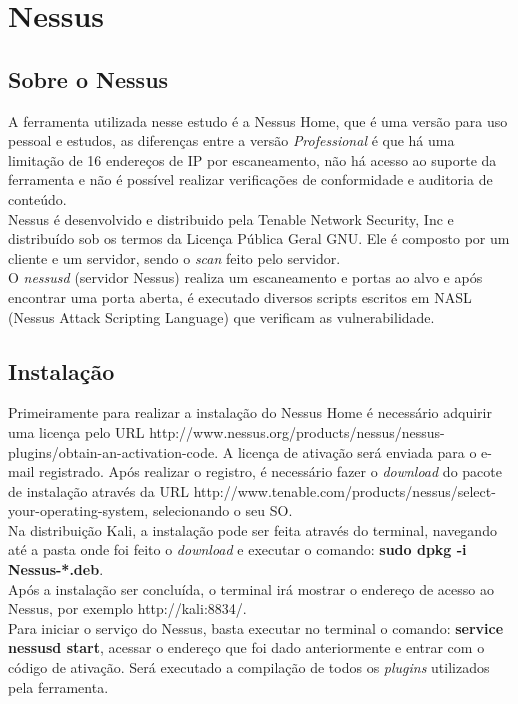 \documentclass[
	12pt,				%
	openright,			%
	twoside,			%
	a4paper,			%
	english,			%
	french,				%
	spanish,			%
	brazil				%
	]{abntex2}
\begin{document}
\chapter{Nessus}

\section{Sobre o Nessus}
A ferramenta utilizada nesse estudo é a Nessus Home, que é uma versão para uso pessoal e estudos, as diferenças entre a versão \textit{Professional} é que há uma limitação de 16 endereços de IP por escaneamento, não há acesso ao suporte da ferramenta e não é possível realizar verificações de conformidade e auditoria de conteúdo.
\\Nessus é desenvolvido e distribuido pela Tenable Network Security, Inc e distribuído sob os termos da Licença Pública Geral GNU. Ele é composto por um cliente e um servidor, sendo o \textit{scan} feito pelo servidor.
\\O \textit{nessusd} (servidor Nessus) realiza um escaneamento e portas ao alvo e após encontrar uma porta aberta, é executado diversos scripts escritos em  NASL (Nessus Attack Scripting Language) que verificam as vulnerabilidade.

\section{Instalação}
Primeiramente para realizar a instalação do Nessus Home é necessário adquirir uma licença pelo URL http://www.nessus.org/products/nessus/nessus-plugins/obtain-an-activation-code. A licença de ativação será enviada para o e-mail registrado.
Após realizar o registro, é necessário fazer o \textit{download} do pacote de instalação através da URL http://www.tenable.com/products/nessus/select-your-operating-system, selecionando o seu SO.
\\Na distribuição Kali, a instalação pode ser feita através do terminal, navegando até a pasta onde foi feito o \textit{download} e executar o comando: \textbf{sudo dpkg -i Nessus-*.deb}.
\\Após a instalação ser concluída, o terminal irá mostrar o endereço de acesso ao Nessus, por exemplo http://kali:8834/.
\\Para iniciar o serviço do Nessus, basta executar no terminal o comando: \textbf{service nessusd start}, acessar o endereço que foi dado anteriormente e entrar com o código de ativação. Será executado a compilação de todos os \textit{plugins} utilizados pela ferramenta.
\end{document}
